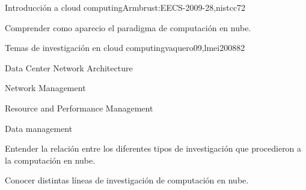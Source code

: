 \begin{syllabus}
\begin{unit}{Introducción a cloud computing}{Armbrust:EECS-2009-28,nistcc}{7}{2}
   \begin{topics}
        \item \ARDistributedArchitecturesTopicNetwork%
        \item \SESpecializedSystemsTopicClient%
        \item \SESpecializedSystemsTopicDistributed%
        \item \SESpecializedSystemsTopicParallel%
        \item \SESpecializedSystemsTopicWeb%
   \end{topics}

   \begin{unitgoals}
        \item \ARDistributedArchitecturesObjSIX%
        \item \SESpecializedSystemsObjONE%
        \item \SESpecializedSystemsObjFIVE%
        \item Comprender como aparecio el paradigma de computación en nube.
   \end{unitgoals}
\end{unit}

\begin{unit}{Temas de investigación en cloud computing}{vaquero09,lmei2008}{8}{2}
   \begin{topics}
        \item Data Center Network Architecture
        \item Network Management
        \item Resource and Performance Management
        \item Data management
   \end{topics}

   \begin{unitgoals}
        \item Entender la relación entre los diferentes tipos de investigación que procedieron a la computación en nube.
        \item Conocer distintas líneas de investigación de computación en nube.
   \end{unitgoals}
\end{unit}


\end{syllabus}

